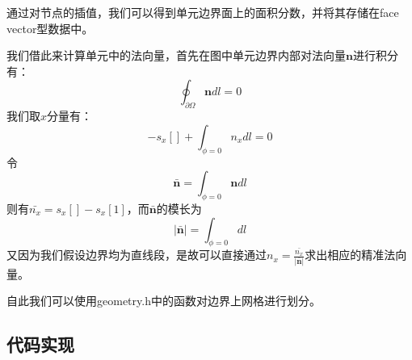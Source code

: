 \documentclass[lang=cn,11pt,a4paper]{elegantpaper}
\begin{document}
通过对节点的插值，我们可以得到单元边界面上的面积分数，并将其存储在face
vector型数据中。\par
我们借此来计算单元中的法向量，首先在图中单元边界内部对法向量$\mathbf{n}$进行积分有：
\begin{equation}
    \oint_{\partial \Omega}\mathbf{n}dl = 0
\end{equation}
我们取$x$分量有：
\begin{equation}
    -s_x[]+\int_{\phi = 0}n_xdl = 0
\end{equation}
令
\begin{equation}
    \bar{\mathbf{n}} = \int_{\phi = 0}\mathbf{n}dl
\end{equation}
则有$\bar{n_x} = s_x[] - s_x[1]$，而$\bar{\mathbf{n}}$的模长为
\begin{equation}
    \lvert \bar{\mathbf{n}} \rvert = \int_{\phi=0}dl
\end{equation}
又因为我们假设边界均为直线段，是故可以直接通过$n_x = \frac{\bar{n_x}}{\lvert \bar{\mathbf{n}} \rvert}$求出相应的精准法向量。\par
自此我们可以使用geometry.h中的函数对边界上网格进行划分。
\subsection{代码实现}
\end{document}
